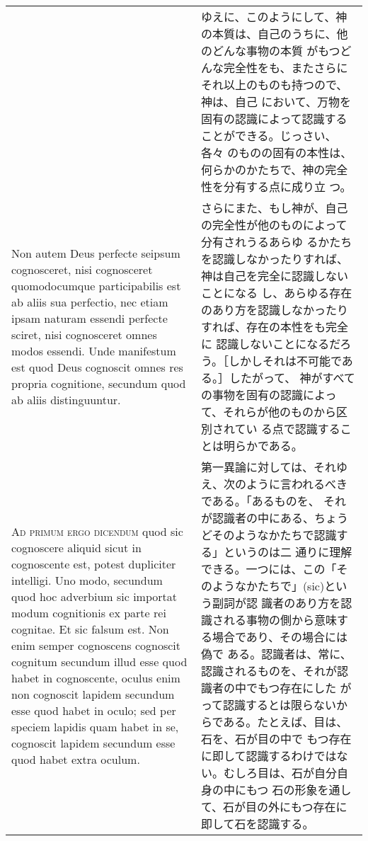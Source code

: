 \documentclass[10pt]{jsarticle} %
\begin{document}
\begin{longtable}{p{21em}p{21em}}
&

ゆえに、このようにして、神の本質は、自己のうちに、他のどんな事物の本質
がもつどんな完全性をも、またさらにそれ以上のものも持つので、神は、自己
において、万物を固有の認識によって認識することができる。じっさい、各々
のものの固有の本性は、何らかのかたちで、神の完全性を分有する点に成り立
つ。


\\


Non autem Deus
perfecte seipsum cognosceret, nisi cognosceret quomodocumque
participabilis est ab aliis sua perfectio, nec etiam ipsam naturam
essendi perfecte sciret, nisi cognosceret omnes modos essendi. Unde
manifestum est quod Deus cognoscit omnes res propria cognitione,
secundum quod ab aliis distinguuntur.


&

さらにまた、もし神が、自己の完全性が他のものによって分有されうるあらゆ
るかたちを認識しなかったりすれば、神は自己を完全に認識しないことになる
し、あらゆる存在のあり方を認識しなかったりすれば、存在の本性をも完全に
認識しないことになるだろう。［しかしそれは不可能である。］したがって、
神がすべての事物を固有の認識によって、それらが他のものから区別されてい
る点で認識することは明らかである。


\\


{\scshape Ad primum ergo dicendum} quod sic cognoscere
aliquid sicut in cognoscente est, potest dupliciter intelligi. Uno modo,
secundum quod hoc adverbium sic importat modum cognitionis ex parte rei
cognitae. Et sic falsum est. Non enim semper cognoscens cognoscit
cognitum secundum illud esse quod habet in cognoscente, oculus enim non
cognoscit lapidem secundum esse quod habet in oculo; sed per speciem
lapidis quam habet in se, cognoscit lapidem secundum esse quod habet
extra oculum. 

& 

第一異論に対しては、それゆえ、次のように言われるべきである。「あるものを、
それが認識者の中にある、ちょうどそのようなかたちで認識する」というのは二
通りに理解できる。一つには、この「そのようなかたちで」(sic)という副詞が認
識者のあり方を認識される事物の側から意味する場合であり、その場合には偽で
ある。認識者は、常に、認識されるものを、それが認識者の中でもつ存在にした
がって認識するとは限らないからである。たとえば、目は、石を、石が目の中で
もつ存在に即して認識するわけではない。むしろ目は、石が自分自身の中にもつ
石の形象を通して、石が目の外にもつ存在に即して石を認識する。


\\




\end{longtable}
\end{document}

